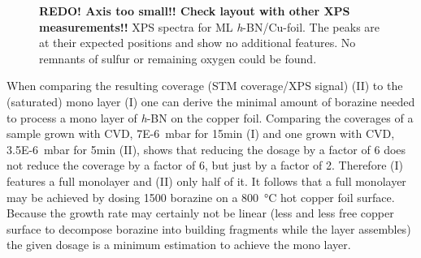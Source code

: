 \begin{figure}[ht]
	\centering
	\caption{\textbf{REDO! Axis too small!! Check layout with other XPS measurements!!} XPS spectra for ML \textit{h}-BN/Cu-foil. The peaks are at their expected positions\cite{kidambi_situ_2014} and show no additional features. No remnants of sulfur or remaining oxygen could be found.}
	\label{fig:xps-self-grown}
\end{figure}

When comparing the resulting coverage (STM coverage/XPS signal) (II) to the (saturated) mono layer (I) one can derive the minimal amount of borazine needed to process a mono layer of \textit{h}-BN on the copper foil. Comparing the coverages of a sample grown with CVD, \SI{7E-6}{\milli \bar} for 15min (I) and one grown with CVD, \SI{3.5E-6}{\milli \bar} for 5min (II), shows that reducing the dosage by a factor of 6 does not reduce the coverage by a factor of 6, but just by a factor of 2. Therefore (I) features a full monolayer and (II) only half of it. It follows that a full monolayer may be achieved by dosing \SI{1500}{\langmuir} borazine on a \SI{800}{\degreeCelsius} hot copper foil surface. 
Because the growth rate may certainly not be linear (less and less free copper surface to decompose borazine into building fragments while the layer assembles) the given dosage is a minimum estimation to achieve the mono layer.

